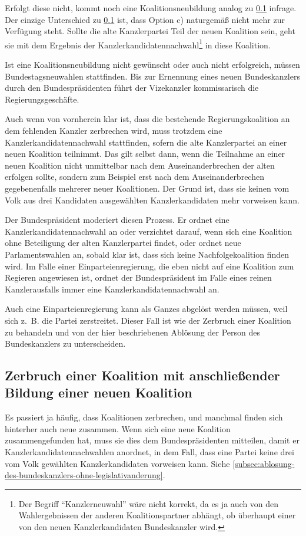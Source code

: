 Erfolgt diese nicht, kommt noch eine Koalitionsneubildung analog zu \cref{koalitionszerbruch-mit-neubildung} infrage.
Der einzige Unterschied zu \cref{koalitionszerbruch-mit-neubildung} ist, dass Option c) naturgemäß nicht mehr zur
Verfügung steht.
Sollte die alte Kanzlerpartei Teil der neuen Koalition sein, geht sie mit dem Ergebnis der Kanzlerkandidatennachwahl\footnote{Der Begriff \enquote{Kanzlerneuwahl} wäre nicht korrekt, da es ja auch von den Wahlergebnissen der anderen Koalitionspartner abhängt, ob überhaupt einer von den neuen Kanzlerkandidaten Bundeskanzler wird.} in diese Koalition.

Ist eine Koalitionsneubildung nicht gewünscht oder auch nicht erfolgreich, müssen Bundestagsneuwahlen stattfinden.
Bis zur Ernennung eines neuen Bundeskanzlers durch den Bundespräsidenten führt der Vizekanzler kommissarisch die Regierungsgeschäfte.

Auch wenn von vornherein klar ist, dass die bestehende Regierungskoalition an dem fehlenden Kanzler zerbrechen wird,
muss trotzdem eine Kanzlerkandidatennachwahl stattfinden, sofern die alte Kanzlerpartei an einer neuen Koalition teilnimmt.
Das gilt selbst dann, wenn die Teilnahme an einer neuen Koalition nicht unmittelbar nach dem Auseinanderbrechen der alten erfolgen sollte,
sondern zum Beispiel erst nach dem Auseinanderbrechen gegebenenfalls mehrerer neuer Koalitionen.
Der Grund ist, dass sie keinen vom Volk aus drei Kandidaten ausgewählten Kanzlerkandidaten mehr vorweisen kann.

Der Bundespräsident moderiert diesen Prozess.
Er ordnet eine Kanzlerkandidatennachwahl an oder verzichtet darauf, wenn sich eine Koalition ohne Beteiligung der alten Kanzlerpartei findet,
oder ordnet neue Parlamentswahlen an, sobald klar ist, dass sich keine Nachfolgekoalition finden wird.
Im Falle einer Einparteienregierung, die eben nicht auf eine Koalition zum Regieren angewiesen ist, ordnet der Bundespräsident
im Falle eines reinen Kanzlerausfalls immer eine Kanzlerkandidatennachwahl an.

Auch eine Einparteienregierung kann als Ganzes abgelöst werden müssen, weil sich z.~B. die Partei zerstreitet.
Dieser Fall ist wie der Zerbruch einer Koalition zu behandeln und von der hier beschriebenen Ablösung der Person des Bundeskanzlers zu unterscheiden.

\subsection{Zerbruch einer Koalition mit anschließender Bildung einer neuen Koalition} \label{koalitionszerbruch-mit-neubildung}
Es passiert ja häufig, dass Koalitionen zerbrechen, und manchmal finden sich hinterher auch neue zusammen.
Wenn sich eine neue Koalition zusammengefunden hat, muss sie dies dem Bundespräsidenten mitteilen, damit er Kanzlerkandidatennachwahlen anordnet,
in dem Fall, dass eine Partei keine drei vom Volk gewählten Kanzlerkandidaten vorweisen kann.
Siehe \cref{subsec:ablosung-des-bundeskanzlers-ohne-legislativanderung}.

